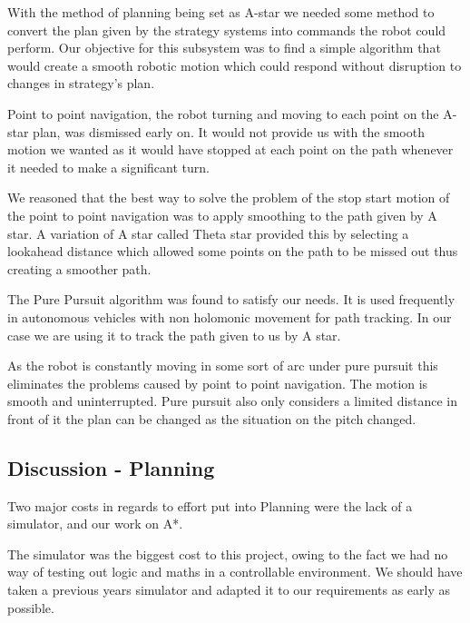 With the method of planning being set as A-star we needed some method to
convert the plan given by the strategy systems into commands the robot could
perform. Our objective for this subsystem was to find a simple algorithm that
would create a smooth robotic motion which could respond without disruption to
changes in strategy's plan.

Point to point navigation, the robot turning and moving to each point on the
A-star plan, was dismissed early on. It would not provide us with the smooth
motion we wanted as it would have stopped at each point on the path whenever it
needed to make a significant turn.

We reasoned that the best way to solve the problem of the stop start motion of
the point to point navigation was to apply smoothing to the path given by
A star. A variation of A star called Theta star provided this by selecting
a lookahead distance which allowed some points on the path to be missed out
thus creating a smoother path.

The Pure Pursuit algorithm was found to satisfy our needs. It is used
frequently in autonomous vehicles with non holomonic
movement for path tracking\cite{agvpp}\cite{coulterpp}. In our case we are
using it to track the path given to us by A star.

As the robot is constantly moving in some sort of arc under pure pursuit this
eliminates the problems caused by point to point navigation. The motion is
smooth and uninterrupted. Pure pursuit also only considers a limited distance
in front of it the plan can be changed as the situation on the pitch changed.

\subsection{Discussion - Planning}


Two major costs in regards to effort put into Planning were the lack of a 
simulator, and our work on A*. 

The simulator was the biggest cost to this project, owing to the fact we had
no way of testing out logic and maths in a controllable environment. We should
have taken a previous years simulator and adapted it to our requirements as
early as possible. 

